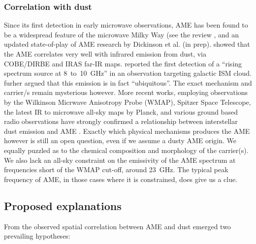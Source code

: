     \subsubsection{Correlation with dust}
         Since its first detection in early microwave observations, AME has been found to be a widespread feature of the microwave Milky Way (see the review \cite{dickinson13r}, and an updated state-of-play of AME research by Dickinson et al. (in prep). \cite{kogut96,deoliveiracosta97} showed that the AME correlates very well with infrared emission from dust, via COBE/DIRBE and IRAS far-IR maps.  \cite{finkbeiner02} reported the first detection of a ``rising spectrum source at 8~to~10~GHz'' in an observation targeting galactic ISM cloud. \cite{deoliveiracosta02} furher argued that this emission is in fact ``ubiquitous''. The exact mechanism and carrier/s remain mysterious however.
        More recent works, employing observations by the Wilkinson Micrwave Anisotropy Probe (WMAP), Spitzer Space Telescope, the latest IR to microwave all-sky maps by Planck, and various ground based radio observations have strongly confirmed a relationship between interstellar dust emission and AME \citep{ysard10a,tibbs11,hensley16}. Exactly which physical mechanisms produces the AME however is still an open question, even if we assume a dusty AME origin. We equally puzzled as to the chemical composition and morphology of the carrier(s). We also lack an all-sky constraint on the emissivity of the AME spectrum at frequencies short of the WMAP cut-off, around 23~GHz. The typical peak frequency of AME, in those cases where it is constrained, does give us a clue.

  \subsection{Proposed explanations}
     From the observed spatial correlation between AME and dust emerged two prevailing hypotheses:

